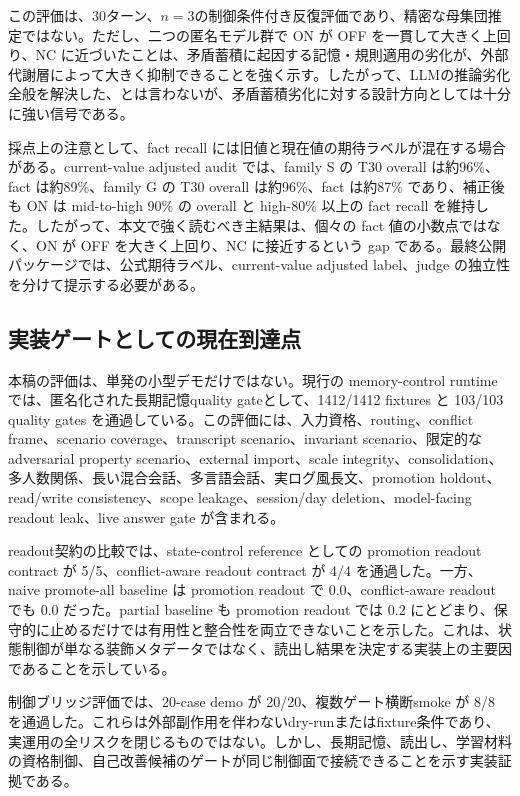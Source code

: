 \documentclass[12pt,a4paper]{article}
\begin{document}
この評価は、30ターン、\(n=3\)の制御条件付き反復評価であり、精密な母集団推定ではない。ただし、二つの匿名モデル群で ON が OFF を一貫して大きく上回り、NC に近づいたことは、矛盾蓄積に起因する記憶・規則適用の劣化が、外部代謝層によって大きく抑制できることを強く示す。したがって、LLMの推論劣化全般を解決した、とは言わないが、矛盾蓄積劣化に対する設計方向としては十分に強い信号である。

採点上の注意として、fact recall には旧値と現在値の期待ラベルが混在する場合がある。current-value adjusted audit では、family S の T30 overall は約96\%、fact は約89\%、family G の T30 overall は約96\%、fact は約87\% であり、補正後も ON は mid-to-high 90\% の overall と high-80\% 以上の fact recall を維持した。したがって、本文で強く読むべき主結果は、個々の fact 値の小数点ではなく、ON が OFF を大きく上回り、NC に接近するという gap である。最終公開パッケージでは、公式期待ラベル、current-value adjusted label、judge の独立性を分けて提示する必要がある。

\subsection{実装ゲートとしての現在到達点}\label{ux5b9fux88c5ux30b2ux30fcux30c8ux3068ux3057ux3066ux306eux73feux5728ux5230ux9054ux70b9}

本稿の評価は、単発の小型デモだけではない。現行の memory-control runtime では、匿名化された長期記憶quality gateとして、1412/1412 fixtures と 103/103 quality gates を通過している。この評価には、入力資格、routing、conflict frame、scenario coverage、transcript scenario、invariant scenario、限定的な adversarial property scenario、external import、scale integrity、consolidation、多人数関係、長い混合会話、多言語会話、実ログ風長文、promotion holdout、read/write consistency、scope leakage、session/day deletion、model-facing readout leak、live answer gate が含まれる。

readout契約の比較では、state-control reference としての promotion readout contract が 5/5、conflict-aware readout contract が 4/4 を通過した。一方、naive promote-all baseline は promotion readout で 0.0、conflict-aware readout でも 0.0 だった。partial baseline も promotion readout では 0.2 にとどまり、保守的に止めるだけでは有用性と整合性を両立できないことを示した。これは、状態制御が単なる装飾メタデータではなく、読出し結果を決定する実装上の主要因であることを示している。

制御ブリッジ評価では、20-case demo が 20/20、複数ゲート横断smoke が 8/8 を通過した。これらは外部副作用を伴わないdry-runまたはfixture条件であり、実運用の全リスクを閉じるものではない。しかし、長期記憶、読出し、学習材料の資格制御、自己改善候補のゲートが同じ制御面で接続できることを示す実装証拠である。
\end{document}
